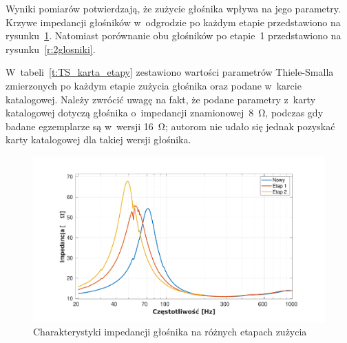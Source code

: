 \documentclass[12pt]{oska}
\begin{document}
	Wyniki pomiarów potwierdzają, że zużycie głośnika wpływa na jego parametry. Krzywe impedancji głośników w~odgrodzie po każdym etapie przedstawiono na rysunku~\ref{r:wygrzewanie}. Natomiast porównanie obu głośników po etapie~1 przedstawiono na rysunku~\ref{r:2glosniki}.
	
	W~tabeli~\ref{t:TS_karta_etapy} zestawiono wartości parametrów Thiele-Smalla zmierzonych po każdym etapie zużycia głośnika oraz podane w~karcie katalogowej. Należy zwrócić uwagę na fakt, że podane parametry z~karty katalogowej dotyczą głośnika o~impedancji znamionowej~\SI{8}{\ohm}, podczas gdy badane egzemplarze są w~wersji \SI{16}{\ohm}; autorom nie udało się jednak pozyskać karty katalogowej dla takiej wersji głośnika.
	
	\begin{figure}[!ht]
	\centering
	\includegraphics[width=.8\textwidth,trim={2cm .5cm 2cm 1cm},clip]{odgroda_wygrzewanie.pdf}
	\caption{Charakterystyki impedancji głośnika na różnych etapach zużycia}
	\label{r:wygrzewanie}
	\end{figure}
	
\end{document}
